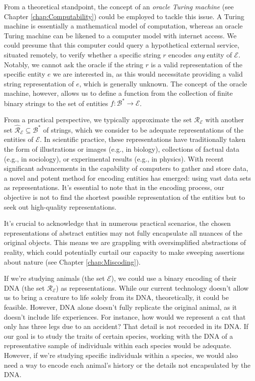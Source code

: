 From a theoretical standpoint, the concept of an \emph{oracle Turing machine} (see Chapter \ref{chap:Computability}) could be employed to tackle this issue. A Turing machine is essentially a mathematical model of computation, whereas an oracle Turing machine can be likened to a computer model with internet access. We could presume that this computer could query a hypothetical external service, situated remotely, to verify whether a specific string $r$ encodes \emph{any} entity of $\mathcal{E}$. Notably, we cannot ask the oracle if the string $r$ is a valid representation of the specific entity $e$ we are interested in, as this would necessitate providing a valid string representation of $e$, which is generally unknown. The concept of the oracle machine, however, allows us to define a function from the collection of finite binary strings to the set of entities $f:\mathcal{B}^\ast \rightarrow \mathcal{E}$.

From a practical perspective, we typically approximate the set $\mathcal{R}_\mathcal{E}$ with another set $\hat{\mathcal{R}}_\mathcal{E} \subseteq \mathcal{B}^\ast$ of strings, which we consider to be adequate representations of the entities of $\mathcal{E}$. In scientific practice, these representations have traditionally taken the form of illustrations or images (e.g., in biology), collections of factual data (e.g., in sociology), or experimental results (e.g., in physics). With recent significant advancements in the capability of computers to gather and store data, a novel and potent method for encoding entities has emerged: using vast data sets as representations. It's essential to note that in the encoding process, our objective is not to find the shortest possible representation of the entities but to seek out high-quality representations.

It's crucial to acknowledge that in numerous practical scenarios, the chosen representations of abstract entities may not fully encapsulate all nuances of the original objects. This means we are grappling with oversimplified abstractions of reality, which could potentially curtail our capacity to make sweeping assertions about nature (see Chapter \ref{chap:Miscoding}).

\begin{example}
\label{ex:animals_DNA}
If we're studying animals (the set $\mathcal{E}$), we could use a binary encoding of their DNA (the set $\mathcal{R_\mathcal{E}}$) as representations. While our current technology doesn't allow us to bring a creature to life solely from its DNA, theoretically, it could be feasible. However, DNA alone doesn't fully replicate the original animal, as it doesn't include life experiences. For instance, how would we represent a cat that only has three legs due to an accident? That detail is not recorded in its DNA. If our goal is to study the traits of certain species, working with the DNA of a representative sample of individuals within each species would be adequate. However, if we're studying specific individuals within a species, we would also need a way to encode each animal's history or the details not encapsulated by the DNA.
\end{example}


